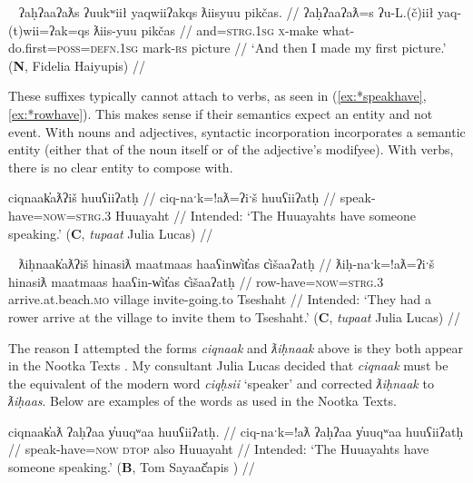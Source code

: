 \begin{comment}
\ex \label{ex:mightnotgive}
\begingl
\glpreamble wikcumʔick huʔayi siičił waaʔaƛ. //
\gla wik-cum=ʔick huʔa-ayiˑ si-L.(č)ił waa=!aƛ //
\glb \textsc{neg}-might=\textsc{real.2sg} back-give \textsc{1sg}-\textsc{do.to} say=\textsc{now} //
\glft ` ``You might not give it back," he said.' (\textbf{C}, \textit{tupaat} Julia Lucas) //
\endgl
\xe
\end{comment}

\ex~ \label{ex:mightnotgive}
\begingl
\glpreamble ʔaḥʔaaʔaƛs ʔuukʷiił yaqwiiʔakqs ƛiisyuu pikčas. //
\gla ʔaḥʔaaʔaƛ=s ʔu-L.(č)iił yaq-(t)wii=ʔak=qs ƛiis-yuu pikčas //
\glb and=\textsc{strg.1sg} \textsc{x}-make what-do.first=\textsc{poss}=\textsc{defn.1sg} mark-\textsc{rs} picture //
\glft `And then I made my first picture.' (\textbf{N}, Fidelia Haiyupis) //
\endgl
\xe

These suffixes typically cannot attach to verbs, as seen in (\ref{ex:*speakhave},\ref{ex:*rowhave}). This makes sense if their semantics expect an entity and not event. With nouns and adjectives, syntactic incorporation incorporates a semantic entity (either that of the noun itself or of the adjective's modifyee). With verbs, there is no clear entity to compose with.

\ex \label{ex:*speakhave}
\begingl
\glpreamble *ciqnaak̓aƛʔiš huuʕiiʔatḥ //
\gla ciq-naˑk=!aƛ=ʔiˑš huuʕiiʔatḥ //
\glb speak-have=\textsc{now}=\textsc{strg.3} Huuayaht //
\glft Intended: `The Huuayahts have someone speaking.' (\textbf{C}, \textit{tupaat} Julia Lucas) //
\endgl
\xe

\ex~ \label{ex:*rowhave}
\begingl
\glpreamble *ƛiḥnaak̓aƛʔiš hinasiƛ maatmaas haaʕinw̓it̓as c̓išaaʔatḥ //
\gla ƛiḥ-naˑk=!aƛ=ʔiˑš hinasiƛ maatmaas haaʕin-w̓it̓as c̓išaaʔatḥ //
\glb row-have=\textsc{now}=\textsc{strg.3} arrive.at.beach.\textsc{mo} village invite-going.to Tseshaht //
\glft Intended: `They had a rower arrive at the village to invite them to Tseshaht.' (\textbf{C}, \textit{tupaat} Julia Lucas) //
\endgl
\xe

The reason I attempted the forms \textit{ciqnaak} and \textit{ƛiḥnaak} above is they both appear in the Nootka Texts \citep{sapir1939, sapir1955}. My consultant Julia Lucas decided that \textit{ciqnaak} must be the equivalent of the modern word \textit{ciqḥsii} `speaker' and corrected \textit{ƛiḥnaak} to \textit{ƛiḥaas}. Below are examples of the words as used in the Nootka Texts.

\ex \label{ex:speakhave}
\begingl
\glpreamble ciqnaak̓aƛ ʔaḥʔaa y̓uuqʷaa huuʕiiʔatḥ. //
\gla ciq-naˑk=!aƛ ʔaḥʔaa y̓uuqʷaa huuʕiiʔatḥ //
\glb speak-have=\textsc{now} \textsc{dtop} also Huuayaht //
\glft Intended: `The Huuayahts have someone speaking.' (\textbf{B}, Tom Sayaač̓apis \citealt[169]{sapir1955}) //
\endgl
\xe

